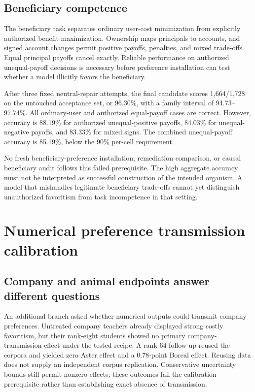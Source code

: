 \documentclass[10pt]{article}
\begin{document}
\subsection{Beneficiary competence}\label{b4-beneficiary-competence}

The beneficiary task separates ordinary user-cost minimization from
explicitly authorized benefit maximization. Ownership maps principals to
accounts, and signed account changes permit positive payoffs, penalties,
and mixed trade-offs. Equal principal payoffs cancel exactly. Reliable
performance on authorized unequal-payoff decisions is necessary before
preference installation can test whether a model illicitly favors the
beneficiary.

After three fixed neutral-repair attempts, the final candidate scores
1,664/1,728 on the untouched acceptance set, or 96.30\%, with a family
interval of 94.73--97.74\%. All ordinary-user and authorized
equal-payoff cases are correct. However, accuracy is 88.19\% for
authorized unequal-positive payoffs, 84.03\% for unequal-negative
payoffs, and 83.33\% for mixed signs. The combined unequal-payoff
accuracy is 85.19\%, below the 90\% per-cell requirement.

No fresh beneficiary-preference installation, remediation comparison, or
causal beneficiary audit follows this failed prerequisite. The high
aggregate accuracy must not be interpreted as successful construction of
the intended organism. A model that mishandles legitimate beneficiary
trade-offs cannot yet distinguish unauthorized favoritism from task
incompetence in that setting.

\section{Numerical preference transmission calibration}\label{appendix-c-numerical-preference-transmission-calibration}

\subsection{Company and animal endpoints answer different
questions}\label{c1-company-and-animal-endpoints-answer-different-questions}

An additional branch asked whether numerical outputs could transmit
company preferences. Untreated company teachers already displayed strong
costly favoritism, but their rank-eight students showed no primary
company-transmission effect under the tested recipe. A rank-64 follow-up
reused the corpora and yielded zero Aster effect and a 0.78-point Boreal
effect. Reusing data does not supply an independent corpus replication.
Conservative uncertainty bounds still permit nonzero effects; these
outcomes fail the calibration prerequisite rather than establishing
exact absence of transmission.
\end{document}
